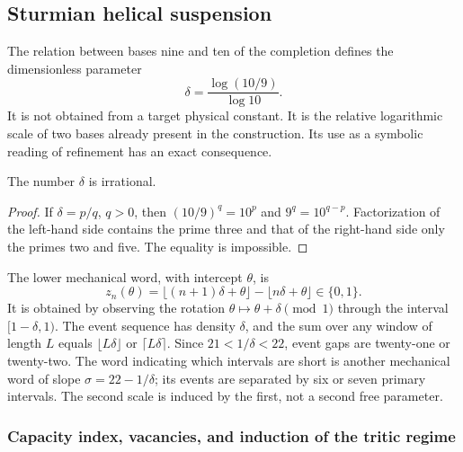 \subsection{Sturmian helical suspension}

The relation between bases nine and ten of the completion defines the dimensionless parameter
\begin{equation}
 \delta=\frac{\log(10/9)}{\log10}.
 \label{x_reciprocidad:eq:delta-sturm}
\end{equation}
It is not obtained from a target physical constant. It is the relative logarithmic scale of two bases already present in the construction. Its use as a symbolic reading of refinement has an exact consequence.

\begin{lemma}
The number \(\delta\) is irrational.
\end{lemma}
\begin{proof}
If \(\delta=p/q\), \(q>0\), then \((10/9)^q=10^p\) and \(9^q=10^{q-p}\). Factorization of the left-hand side contains the prime three and that of the right-hand side only the primes two and five. The equality is impossible.
\end{proof}

The lower mechanical word, with intercept \(\theta\), is
\[
 z_n(\theta)=\lfloor(n+1)\delta+\theta\rfloor-\lfloor n\delta+\theta\rfloor\in\{0,1\}.
\]
It is obtained by observing the rotation \(\theta\mapsto\theta+\delta\pmod1\) through the interval \([1-\delta,1)\). The event sequence has density \(\delta\), and the sum over any window of length \(L\) equals \(\lfloor L\delta\rfloor\) or \(\lceil L\delta\rceil\). Since \(21<1/\delta<22\), event gaps are twenty-one or twenty-two. The word indicating which intervals are short is another mechanical word of slope \(\sigma=22-1/\delta\); its events are separated by six or seven primary intervals. The second scale is induced by the first, not a second free parameter.


\subsubsection{Capacity index, vacancies, and induction of the tritic regime}
\label{x_reciprocidad:vac-capacidad-trit}

